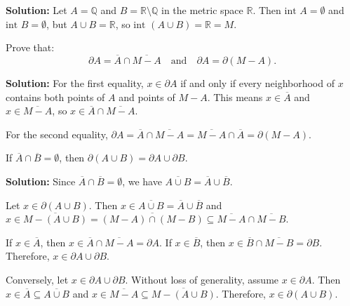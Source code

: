 \textbf{Solution:} Let $A = \mathbb{Q}$ and $B = \mathbb{R} \setminus \mathbb{Q}$ in the metric space $\mathbb{R}$. Then $\text{int } A = \emptyset$ and $\text{int } B = \emptyset$, but $A \cup B = \mathbb{R}$, so $\text{int } (A \cup B) = \mathbb{R} = M$.

\begin{problembox}
Prove that:
\[
\partial A = \overline{A} \cap \overline{M - A} \quad \text{and} \quad \partial A = \partial(M - A).
\]
\end{problembox}

\textbf{Solution:} For the first equality, $x \in \partial A$ if and only if every neighborhood of $x$ contains both points of $A$ and points of $M - A$. This means $x \in \overline{A}$ and $x \in \overline{M - A}$, so $x \in \overline{A} \cap \overline{M - A}$.

For the second equality, $\partial A = \overline{A} \cap \overline{M - A} = \overline{M - A} \cap \overline{A} = \partial(M - A)$.

\begin{problembox}
If \(\overline{A} \cap \overline{B} = \emptyset\), then \(\partial(A \cup B) = \partial A \cup \partial B\).
\end{problembox}

\textbf{Solution:} Since $\overline{A} \cap \overline{B} = \emptyset$, we have $\overline{A \cup B} = \overline{A} \cup \overline{B}$.

Let $x \in \partial(A \cup B)$. Then $x \in \overline{A \cup B} = \overline{A} \cup \overline{B}$ and $x \in \overline{M - (A \cup B)} = \overline{(M - A) \cap (M - B)} \subseteq \overline{M - A} \cap \overline{M - B}$.

If $x \in \overline{A}$, then $x \in \overline{A} \cap \overline{M - A} = \partial A$. If $x \in \overline{B}$, then $x \in \overline{B} \cap \overline{M - B} = \partial B$. Therefore, $x \in \partial A \cup \partial B$.

Conversely, let $x \in \partial A \cup \partial B$. Without loss of generality, assume $x \in \partial A$. Then $x \in \overline{A} \subseteq \overline{A \cup B}$ and $x \in \overline{M - A} \subseteq \overline{M - (A \cup B)}$. Therefore, $x \in \partial(A \cup B)$.